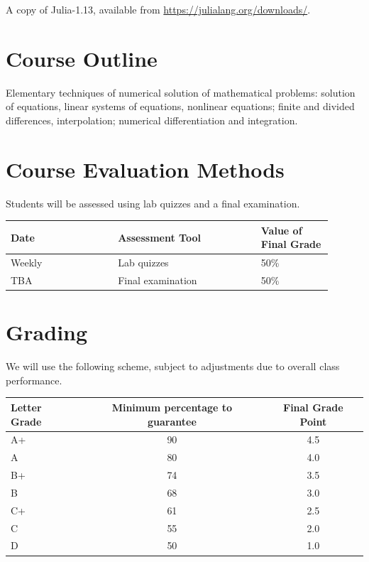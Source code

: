 \documentclass[12pt]{article}
\begin{document}
A copy of {\sc Julia-1.13}, available from \href{https://julialang.org/downloads/}{https://julialang.org/downloads/}.

\section{Course Outline}

Elementary techniques of numerical solution of mathematical problems: solution of equations, linear systems of equations, nonlinear equations; finite and divided differences, interpolation; numerical differentiation and integration.

\section{Course Evaluation Methods}

Students will be assessed using lab quizzes and a final examination.

\begin{center}
\begin{tabular}[t]{p{0.3\linewidth}p{0.4\linewidth}p{0.2\linewidth}}
\toprule
\mbox{}\newline \textbf{Date} &	\mbox{}\newline\textbf{Assessment Tool}	& \textbf{Value of \newline Final Grade} \\
\midrule
Weekly & Lab quizzes & 50\% \\
TBA & Final examination & 50\% \\
\bottomrule
\end{tabular}
\end{center}

\section{Grading}

We will use the following scheme, subject to adjustments due to overall class performance.

\begin{center}
\begin{tabular}[t]{lcc}
\toprule
Letter Grade & Minimum percentage to guarantee & Final Grade Point  \\
\midrule
A+ & 90 & 4.5 \\
A & 80 & 4.0 \\
B+ & 74 & 3.5 \\
B & 68 &  3.0 \\
C+ & 61  & 2.5 \\
C & 55 & 2.0 \\
D & 50 & 1.0  \\
\bottomrule
\end{tabular}
\end{center}
\end{document}
